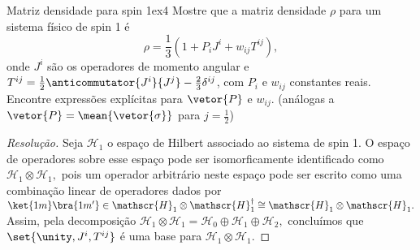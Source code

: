 \begin{exercício}{Matriz densidade para spin 1}{ex4}
    Mostre que a matriz densidade \(\rho\) para um sistema físico de spin 1 é
    \begin{equation*}
        \rho = \frac13 \left(1 + P_iJ^i  + w_{ij} T^{ij}\right),
    \end{equation*}
    onde \(J^i\) são os operadores de momento angular e \(T^{ij} = \frac12\anticommutator{J^i}{J^j} - \frac23 \delta^{ij}\), com \(P_i\) e \(w_{ij}\) constantes reais. Encontre expressões explícitas para \(\vetor{P}\) e \(w_{ij}\). (análogas a \(\vetor{P} = \mean{\vetor{\sigma}}\) para \(j = \frac12\))
\end{exercício}
\begin{proof}[Resolução]
    Seja \(\mathscr{H}_1\) o espaço de Hilbert associado ao sistema de spin 1. O espaço de operadores sobre esse espaço pode ser isomorficamente identificado como \(\mathscr{H}_1 \otimes \mathscr{H}_1,\) pois um operador arbitrário neste espaço pode ser escrito como uma combinação linear de operadores dados por \(\ket{1m}\bra{1m'} \in \mathscr{H}_1 \otimes \mathscr{H}_1^\dag \cong \mathscr{H}_1 \otimes \mathscr{H}_1.\) Assim, pela decomposição \(\mathscr{H}_1 \otimes \mathscr{H}_1 = \mathscr{H}_0 \oplus \mathscr{H}_1 \oplus \mathscr{H}_2,\) concluímos que \(\set{\unity, J^i, T^{ij}}\) é uma base para \(\mathscr{H}_1 \otimes \mathscr{H}_1.\)


\end{proof}
